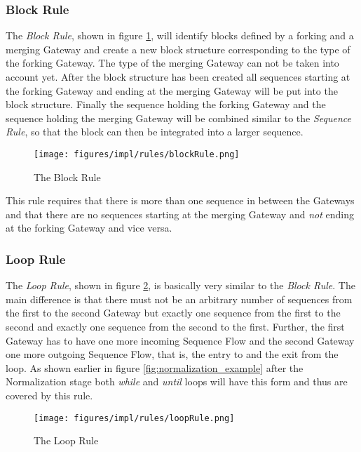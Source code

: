 \subsubsection*{Block Rule}
The \emph{Block Rule}, shown in figure \ref{fig:blockRule}, will identify blocks defined by a forking and a merging Gateway and create a new block structure corresponding to the type of the forking Gateway. The type of the merging Gateway can not be taken into account yet. After the block structure has been created all sequences starting at the forking Gateway and ending at the merging Gateway will be put into the block structure. Finally the sequence holding the forking Gateway and the sequence holding the merging Gateway will be combined similar to the \emph{Sequence Rule}, so that the block can then be integrated into a larger sequence.

\begin{figure}[ht]
	\centering
	\texttt{[image: figures/impl/rules/blockRule.png]}
	\caption[Block Rule]{The Block Rule}
	\label{fig:blockRule}
\end{figure}

This rule requires that there is more than one sequence in between the Gateways and that there are no sequences starting at the merging Gateway and \emph{not} ending at the forking Gateway and vice versa.

\subsubsection*{Loop Rule}
The \emph{Loop Rule}, shown in figure \ref{fig:loopRule}, is basically very similar to the \emph{Block Rule}. The main difference is that there must not be an arbitrary number of sequences from the first to the second Gateway but exactly one sequence from the first to the second and exactly one sequence from the second to the first. Further, the first Gateway has to have one more incoming Sequence Flow and the second Gateway one more outgoing Sequence Flow, that is, the entry to and the exit from the loop. As shown earlier in figure \ref{fig:normalization_example} after the Normalization stage both \emph{while} and \emph{until} loops will have this form and thus are covered by this rule.

\begin{figure}[ht]
	\centering
	\texttt{[image: figures/impl/rules/loopRule.png]}
	\caption[Loop Rule]{The Loop Rule}
	\label{fig:loopRule}
\end{figure}

